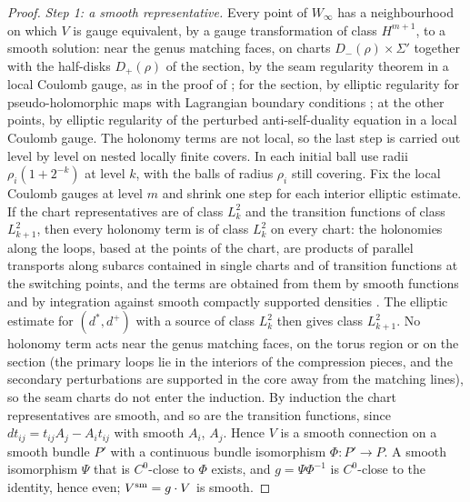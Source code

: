 \documentclass[11pt]{amsart}
\theoremstyle{definition}
\theoremstyle{remark}
\theoremstyle{plain}
\numberwithin{equation}{section}
\begin{document}
\begin{proof}
\emph{Step 1: a smooth representative.} Every point of $W_\infty$ has a neighbourhood on
which $V$ is gauge equivalent, by a gauge transformation of class $H^{m+1}$, to a smooth
solution: near the genus matching faces, on charts $D_-(\rho)\times\Sigma'$ together with the
half-disks $D_+(\rho)$ of the section, by the seam regularity theorem \cite[Theorem~1]{DFL-mixed}
in a local Coulomb gauge, as in the proof of \cite[Proposition~3.6]{DFL}; for the section, by
elliptic regularity for pseudo-holomorphic maps with Lagrangian boundary conditions
\cite[Theorem~B.4.1]{MS}; at the other points, by elliptic regularity of the perturbed
anti-self-duality equation in a local Coulomb gauge. The holonomy terms are not local, so
the last step is carried out level by level on nested locally finite
covers. In each initial ball use radii $\rho_i(1+2^{-k})$ at
level $k$, with the balls of radius $\rho_i$ still covering.
Fix the local Coulomb gauges at level $m$ and shrink one step
for each interior elliptic estimate. If the chart representatives are of class $L^2_k$ and
the transition functions of class $L^2_{k+1}$, then every holonomy term is of class $L^2_k$ on
every chart: the holonomies along the loops, based at the points of the chart, are products
of parallel transports along subarcs contained in single charts and of transition functions
at the switching points, and the terms are obtained from them by smooth functions and by
integration against smooth compactly supported densities
\cite[Proposition~3.1 and Section~3.2]{Kronheimer-higher}.
The elliptic estimate for
$(d^*,d^+)$ with a source of class $L^2_k$ then gives class $L^2_{k+1}$. No holonomy term acts
near the genus matching faces, on the torus region or on the section (the primary loops lie
in the interiors of the compression pieces, and the secondary perturbations are supported in
the core away from the matching lines), so the seam charts do not enter the induction. By
induction the chart representatives are smooth, and so are the transition functions, since
$dt_{ij}=t_{ij}A_j-A_it_{ij}$ with smooth $A_i$, $A_j$. Hence $V$ is a smooth connection on a smooth
bundle $P'$ with a continuous bundle isomorphism $\Phi\colon P'\to P$. A smooth isomorphism $\Psi$
that is $C^0$-close to $\Phi$ exists, and $g=\Psi\Phi^{-1}$ is $C^0$-close to the identity, hence even;
$V^{\rm sm}=g\cdot V$ is smooth.


\end{proof}
\end{document}
